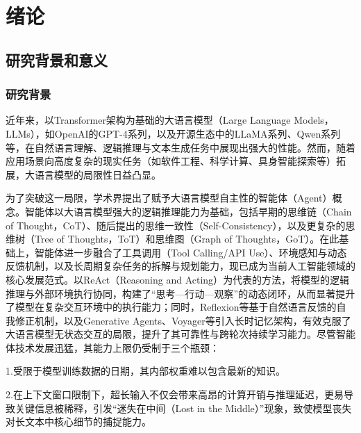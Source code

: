 
\chapter{绪论}
\label{chap:intro}

\section{研究背景和意义}
\subsection{研究背景}
近年来，以Transformer架构为基础的大语言模型（Large Language Models，LLMs）\cite{vaswani2017attention}，如OpenAI的GPT-4系列\cite{ref2}，以及开源生态中的LLaMA系列\cite{ref3,ref4,ref5}、Qwen系列\cite{ref6,ref7,ref8}等，在自然语言理解、逻辑推理与文本生成任务中展现出强大的性能。然而，随着应用场景向高度复杂的现实任务（如软件工程\cite{ref9}、科学计算\cite{ref10}、具身智能探索等\cite{ref11}）拓展，大语言模型的局限性日益凸显\cite{ref12}。

为了突破这一局限，学术界提出了赋予大语言模型自主性的智能体（Agent）概念\cite{ref12}。智能体以大语言模型强大的逻辑推理能力为基础，包括早期的思维链（Chain of Thought，CoT）\cite{ref13}、随后提出的思维一致性（Self-Consistency）\cite{ref14}，以及更复杂的思维树（Tree of Thoughts，ToT）\cite{ref15}和思维图（Graph of Thoughts，GoT）\cite{ref16}。在此基础上，智能体进一步融合了工具调用（Tool Calling/API Use）\cite{ref17,ref18}、环境感知与动态反馈机制，以及长周期复杂任务的拆解与规划能力\cite{ref19}，现已成为当前人工智能领域的核心发展范式\cite{ref20,ref21,ref22}。以ReAct（Reasoning and Acting）\cite{ref23}为代表的方法，将模型的逻辑推理与外部环境执行协同，构建了“思考—行动—观察”的动态闭环，从而显著提升了模型在复杂交互环境中的执行能力\cite{ref24}；同时，Reflexion等基于自然语言反馈的自我修正机制\cite{ref25}，以及Generative Agents、Voyager等\cite{ref26,ref27}引入长时记忆架构，有效克服了大语言模型无状态交互的局限，提升了其可靠性与跨轮次持续学习能力。尽管智能体技术发展迅猛，其能力上限仍受制于三个瓶颈：


\par 1.受限于模型训练数据的日期，其内部权重难以包含最新的知识\cite{ref28}。

\par 2.在上下文窗口限制下，超长输入不仅会带来高昂的计算开销与推理延迟，更易导致关键信息被稀释，引发“迷失在中间（Lost in the Middle）”现象，致使模型丧失对长文本中核心细节的捕捉能力\cite{ref29,ref30}。

